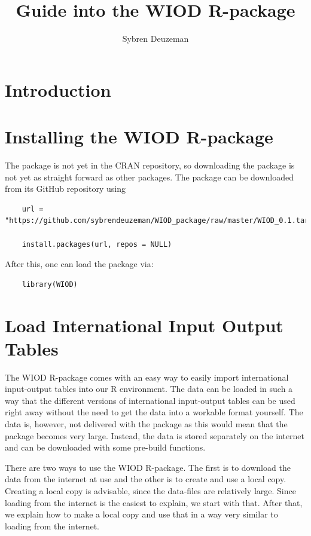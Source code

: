 \documentclass[10pt,a4paper]{paper}
\title{Guide into the WIOD R-package}
\author{Sybren Deuzeman}
\begin{document}
	\maketitle
	
	\section{Introduction}
	
	\section{Installing the WIOD R-package}
	The package is not yet in the CRAN repository, so downloading the package is not yet as straight forward as other packages. The package can be downloaded from its GitHub repository using
	\begin{Verbatim}	
	url = "https://github.com/sybrendeuzeman/WIOD_package/raw/master/WIOD_0.1.tar.gz"
	
	install.packages(url, repos = NULL)
	\end{Verbatim}
	After this, one can load the package via:
	\begin{Verbatim}
	library(WIOD)
	\end{Verbatim}
	
	\section{Load International Input Output Tables}
	
	The WIOD R-package comes with an easy way to easily import international input-output tables into our R environment. The data can be loaded in such a way that the different versions of international input-output tables can be used right away without the need to get the data into a workable format yourself. The data is, however, not delivered with the package as this would mean that the package becomes very large. Instead, the data is stored separately on the internet and can be downloaded with some pre-build functions. 
	
	There are two ways to use the WIOD R-package. The first is to download the data from the internet at use and the other is to create and use a local copy. Creating a local copy is advisable, since the data-files are relatively large. Since loading from the internet is the easiest to explain, we start with that. After that, we explain how to make a local copy and use that in a way very similar to loading from the internet.
	
\end{document}
